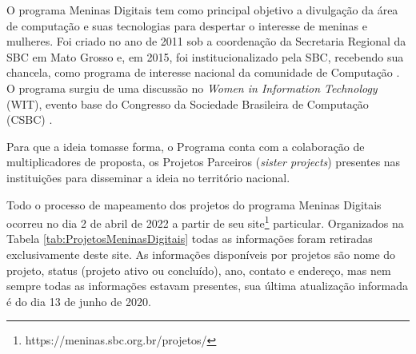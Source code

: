 O programa Meninas Digitais tem como principal objetivo a divulgação da área de computação e suas tecnologias para despertar o interesse de meninas e mulheres. Foi criado no ano de 2011 sob a coordenação da Secretaria Regional da SBC em Mato Grosso e, em 2015, foi institucionalizado pela SBC, recebendo sua chancela, como programa de interesse nacional da comunidade de Computação \cite{meninas:digitais}. O programa surgiu de uma discussão no \textit{Women in Information Technology} (WIT), evento base do Congresso da Sociedade Brasileira de Computação (CSBC) \cite{meninas:digitais}.

Para que a ideia tomasse forma, o Programa conta com a colaboração de multiplicadores de proposta, os Projetos Parceiros (\textit{sister projects}) presentes nas instituições para disseminar a ideia no território nacional.

Todo o processo de mapeamento dos projetos do programa Meninas Digitais ocorreu no dia 2 de abril de 2022 a partir de seu site\footnote{https://meninas.sbc.org.br/projetos/} particular. Organizados na Tabela \ref{tab:ProjetosMeninasDigitais} todas as informações foram retiradas exclusivamente deste site. As informações disponíveis por projetos são nome do projeto, status (projeto ativo ou concluído), ano, contato e endereço, mas nem sempre todas as informações estavam presentes, sua última atualização informada é do dia 13 de junho de 2020.





